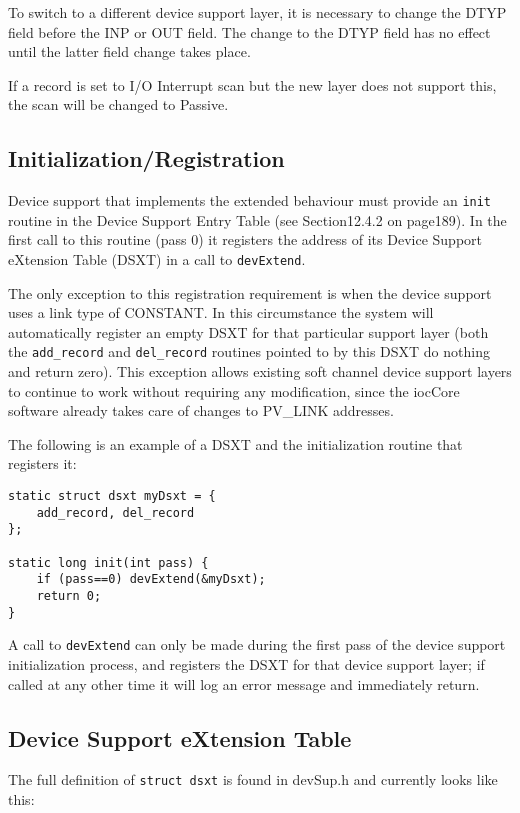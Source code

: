 To switch to a different device support layer, it is necessary to change the DTYP field before the INP or OUT field. The 
change to the DTYP field has no effect until the latter field change takes place.

If a record is set to I/O Interrupt scan but the new layer does not support this, the scan will be changed to Passive.

\subsection{Initialization/Registration}

Device support that implements the extended behaviour must provide an \verb|init| routine in the Device Support Entry Table 
(see Section12.4.2 on page189).   In the first call to this routine (pass 0) it registers the address of its Device Support 
eXtension Table (DSXT) in a call to \verb|devExtend|.

The only exception to this registration requirement is when the device support uses a link type of CONSTANT.  In this 
circumstance the system will automatically register an empty DSXT for that particular support layer (both the 
\verb|add_record| and \verb|del_record| routines pointed to by this DSXT do nothing and return zero). This exception allows 
existing soft channel device support layers to continue to work without requiring any modification, since the iocCore 
software already takes care of changes to PV\_LINK addresses.

The following is an example of a DSXT and the initialization routine that registers it:

\begin{verbatim}
static struct dsxt myDsxt = {
    add_record, del_record
};

static long init(int pass) {
    if (pass==0) devExtend(&myDsxt);
    return 0;
}
\end{verbatim}

A call to \verb|devExtend| can only be made during the first pass of the device support initialization process, and registers the 
DSXT for that device support layer; if called at any other time it will log an error message and immediately return.

\subsection{Device Support eXtension Table}

The full definition of \verb|struct dsxt| is found in devSup.h and currently looks like this:

